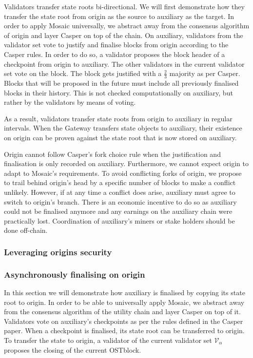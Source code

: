 \documentclass[12pt,a4paper,draft]{article}
\begin{document}
Validators transfer state roots bi-directional.
We will first demonstrate how they transfer the state root from origin as the source to auxiliary as the target.
In order to apply Mosaic universally,
we abstract away from the consensus algorithm of origin and layer Casper \cite{casperffg} on top of the chain.
On auxiliary,
validators from the validator set vote to justify and finalise blocks from origin according to the Casper rules.
In order to do so, a validator proposes the block header of a checkpoint from origin to auxiliary.
The other validators in the current validator set vote on the block.
The block gets justified with a $\frac{2}{3}$ majority as per Casper.
Blocks that will be proposed in the future must include all previously finalised blocks in their history.
This is not checked computationally on auxiliary,
but rather by the validators by means of voting.

As a result, validators transfer state roots from origin to auxiliary in regular intervals.
When the Gateway transfers state objects to auxiliary,
their existence on origin can be proven against the state root that is now stored on auxiliary.


Origin cannot follow Casper's fork choice rule when the justification and finalisation is only recorded on auxiliary.
Furthermore, we cannot expect origin to adapt to Mosaic's requirements.
To avoid conflicting forks of origin,
we propose to trail behind origin's head by a specific number of blocks to make a conflict unlikely.
However, if at any time a conflict does arise, auxiliary must agree to switch to origin's branch.
There is an economic incentive to do so as auxiliary could not be finalised anymore and any earnings on the auxiliary chain were practically lost.
Coordination of auxiliary's miners or stake holders should be done off-chain.

\subsubsection{Leveraging origins security}

\subsubsection{Asynchronously finalising on origin}

In this section we will demonstrate how auxiliary is finalised by copying its state root to origin.
In order to be able to universally apply Mosaic,
we abstract away from the consensus algorithm of the utility chain and layer Casper \cite{casperffg} on top of it.
Validators vote on auxiliary's checkpoints as per the rules defined in the Casper paper.
When a checkpoint is finalised, its state root can be transferred to origin.
To transfer the state to origin, a validator of the current validator set $\mathcal{V}_\alpha$ proposes the closing of the current OSTblock.
\end{document}
